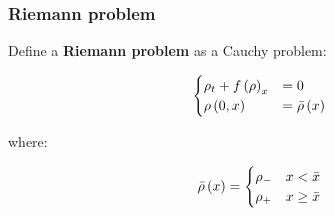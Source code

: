 \begin{frame}
\frametitle{Riemann problem}

Define a \textbf{Riemann problem} as a Cauchy problem:

\begin{equation}
\begin{cases}
\rho_{t}+f\left(\rho\right)_{x} & =0\\
\rho\left(0,x\right) & =\bar{\rho}\left(x\right)
\end{cases}
\end{equation}

where:


\[
\bar{\rho}\left(x\right)=\begin{cases}
\rho_{-} & x<\bar{x}\\
\rho_{+} & x\ge\bar{x}
\end{cases}
\]

\end{frame}


